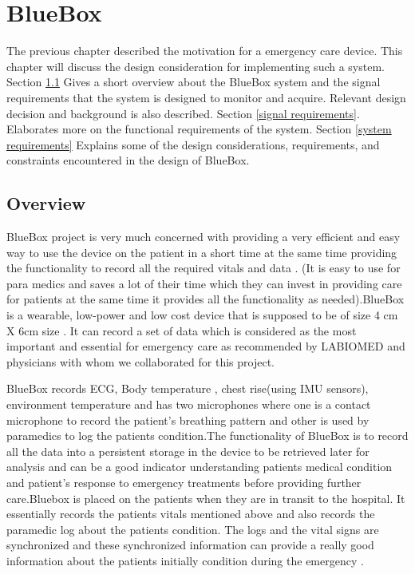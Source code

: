 \chapter{BlueBox }

\hspace{10mm}The previous chapter described the motivation for a emergency care device. This chapter will discuss the design consideration for implementing such a system. 
Section \ref{overview} Gives a short overview about the BlueBox system and the signal requirements that the system is designed to monitor and acquire. Relevant design decision and background is also described. 
Section \ref{signal requirements}. Elaborates more on the functional requirements of the system. 
Section \ref{system requirements} Explains some of the design considerations, requirements, and constraints encountered in the design of BlueBox.

\section{Overview}\label{overview}

\hspace{10mm}BlueBox project is very much concerned with providing a very efficient and easy way to use the device on the patient in a short time at the same time providing the functionality to record all the required vitals and data . (It is easy to use for para medics and saves a lot of their time which they can invest in providing care for patients at the same time it provides all the functionality as needed).BlueBox is a wearable, low-power and low cost device that is supposed to be of size 4 cm X 6cm size . It can record a set of data which is considered as the most important and essential for emergency care as recommended by LABIOMED and physicians with whom we collaborated for this project. 

\hspace{10mm}BlueBox records ECG, Body temperature , chest rise(using IMU sensors), environment temperature and has two microphones where one is a contact microphone to record the patient's breathing pattern and other is used by paramedics to log the patients condition.The functionality of BlueBox is to record all the data into a persistent storage in the device to be retrieved later for analysis and can be a good indicator understanding patients medical condition and patient's response to emergency treatments before providing further care.Bluebox is placed on the patients when they are in transit to the hospital. It essentially records the patients vitals mentioned above and also records the paramedic log about the patients condition. The logs and the vital signs are synchronized and these synchronized information can provide a really good information about the patients initially condition during the emergency . 

